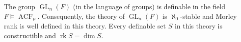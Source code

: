 The group $\operatorname{GL}_n(F)$ (in the language of groups) is definable in the field $F \models \operatorname{ACF}_p$. Consequently, the theory of $\operatorname{GL}_n(F)$ is $\aleph_0$-stable and Morley rank is well defined in this theory. Every definable set $S$ in this theory is constructible and $\operatorname{rk} S = \dim S$.
